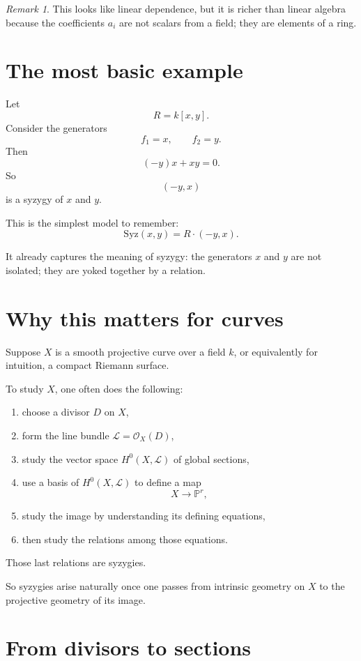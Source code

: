 \documentclass[11pt]{article}
\theoremstyle{definition}
\theoremstyle{remark}
\newtheorem{remark}[theorem]{Remark}
\newcommand{\PP}{\mathbb{P}}
\newcommand{\cO}{\mathcal{O}}
\newcommand{\cL}{\mathcal{L}}
\newcommand{\Syz}{\mathrm{Syz}}
\begin{document}
	\begin{remark}
		This looks like linear dependence, but it is richer than linear algebra because the coefficients \(a_i\) are not scalars from a field; they are elements of a ring.
	\end{remark}
	
	\section{The most basic example}
	
	Let
	\[
	R=k[x,y].
	\]
	Consider the generators
	\[
	f_1=x,\qquad f_2=y.
	\]
	Then
	\[
	(-y)x + x y = 0.
	\]
	So
	\[
	(-y,x)
	\]
	is a syzygy of \(x\) and \(y\).
	
	This is the simplest model to remember:
	\[
	\Syz(x,y)=R\cdot(-y,x).
	\]
	
	It already captures the meaning of syzygy: the generators \(x\) and \(y\) are not isolated; they are yoked together by a relation.
	
	\section{Why this matters for curves}
	
	Suppose \(X\) is a smooth projective curve over a field \(k\), or equivalently for intuition, a compact Riemann surface.
	
	To study \(X\), one often does the following:
	
	\begin{enumerate}[label=\arabic*.]
		\item choose a divisor \(D\) on \(X\),
		\item form the line bundle \(\cL=\cO_X(D)\),
		\item study the vector space \(H^0(X,\cL)\) of global sections,
		\item use a basis of \(H^0(X,\cL)\) to define a map
		\[
		X\to \PP^r,
		\]
		\item study the image by understanding its defining equations,
		\item then study the relations among those equations.
	\end{enumerate}
	
	Those last relations are syzygies.
	
	So syzygies arise naturally once one passes from intrinsic geometry on \(X\) to the projective geometry of its image.
	
	\section{From divisors to sections}
	
\end{document}
